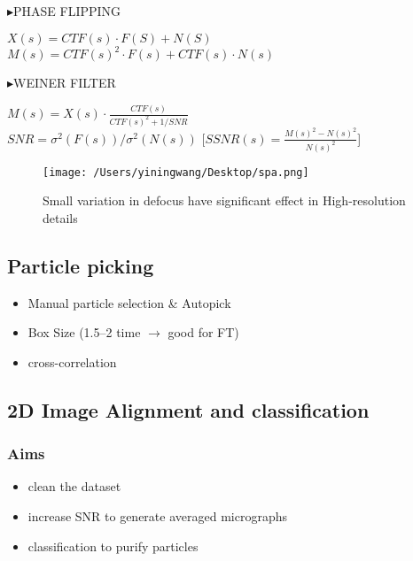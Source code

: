 \documentclass{article}
\begin{document}
    $\blacktriangleright $PHASE FLIPPING
    \begin{center}
        $X (s)=CTF(s)\cdot F(S) +N(S)$\\
        $M(s)=CTF(s)^2 \cdot F(s) + CTF(s) \cdot N(s)$
    \end{center}
    $\blacktriangleright $WEINER FILTER
    \begin{center}
        \begin{framed}
            $M(s)=X(s) \cdot \frac{CTF(s)}{CTF(s)^2 + {1}/{SNR} } $\\
            $SNR=\sigma^2(F(s))/\sigma^2(N(s))$
           [$SSNR(s)=\frac{M(s)^2-N(s)^2}{N(s)^2}$]

        \end{framed}
    \end{center}    
    \begin{figure}[h]
        \centering   
        \texttt{[image: /Users/yiningwang/Desktop/spa.png]} 
        \caption[Significant effect of defocus]{\small Small variation in defocus have significant effect in High-resolution details}
    \end{figure}
    \subsection{Particle picking}
    \begin{center}
        \begin{itemize}
           \item Manual particle selection \& Autopick
           \item Box Size (1.5--2 time $\rightarrow $ good for FT)
           \item cross-correlation
       \end{itemize}  
   \end{center}
    \subsection{2D Image Alignment and classification}
    \subsubsection{Aims}
    \begin{center}
        \begin{itemize}
           \item clean the dataset
           \item increase SNR to generate averaged micrographs
           \item classification to purify particles
       \end{itemize}  
   \end{center}
\end{document}
